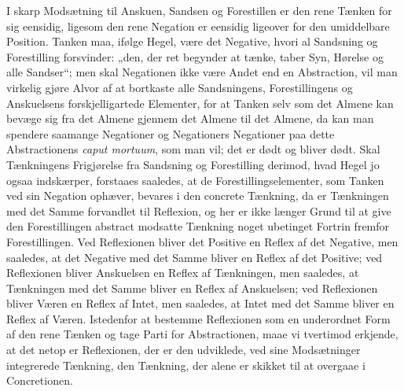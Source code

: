 \documentclass[11pt]{book}
\newcommand{\opage}[1]{\marginnote{\footnotesize\textit{[#1]}}}
\begin{document}
I skarp Modsætning til Anskuen, Sandsen og Forestillen er den rene Tænken
for sig eensidig, ligesom den rene Negation er eensidig ligeover for den
umiddelbare Position. Tanken maa, ifølge Hegel, være det Negative, hvori al
Sandsning og Forestilling forsvinder: „den, der ret begynder at tænke,
taber Syn, Hørelse og alle Sandser“; men skal Negationen ikke være Andet
end en Abstraction, vil man virkelig gjøre Alvor af at bortkaste alle
Sandsningens, Forestillingens og Anskuelsens forskjelligartede Elementer,
for at Tanken selv som det Almene kan bevæge sig fra det Almene gjennem det
Almene til det Almene, da kan man spendere saamange Negationer og
Negationers Negationer paa dette Abstractionens \textit{caput mortuum}, som
man vil; det er dødt og bliver dødt. Skal Tænkningens Frigjørelse fra
Sandsning og Forestilling derimod, hvad Hegel jo ogsaa indskærper, forstaaes
saaledes, at de Forestillingselementer, som Tanken ved
\opage{57} \setcounter{footnote}{0}%
sin Negation ophæver, bevares i den concrete Tænkning, da er Tænkningen med
det Samme forvandlet til Reflexion, og her er ikke længer Grund til at give
den Forestillingen abstract modsatte Tænkning noget ubetinget Fortrin
fremfor Forestillingen. Ved Reflexionen bliver det Positive en Reflex af
det Negative, men saaledes, at det Negative med det Samme bliver en Reflex
af det Positive; ved Reflexionen bliver Anskuelsen en Reflex af Tænkningen,
men saaledes, at Tænkningen med det Samme bliver en Reflex af Anskuelsen;
ved Reflexionen bliver Væren en Reflex af Intet, men saaledes, at Intet med
det Samme bliver en Reflex af Væren. Istedenfor at bestemme Reflexionen som
en underordnet Form af den rene Tænken og tage Parti for Abstractionen,
maae vi tvertimod erkjende, at det netop er Reflexionen, der er den
udviklede, ved sine Modsætninger integrerede Tænkning, den Tænkning, der
alene er skikket til at overgaae i Concretionen.
\end{document}
